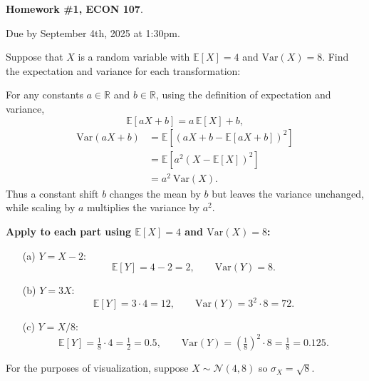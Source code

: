 \documentclass[11pt,answers]{exam}
\newcommand{\R}{\mathbb{R}}
\newcommand{\E}{\mathbb{E}}
\newcommand{\Var}{\mathrm{Var}}
\begin{document}
\begin{center}
  \large \textbf{Homework \#1, ECON 107}.
\end{center}

Due by September 4th, 2025 at 1:30pm.

\begin{questions}

\question Suppose that $X$ is a random variable with $\E[X]=4$ and $\Var(X)=8$.
Find the expectation and variance for each transformation:

\begin{solution}
For any constants $a\in\R$ and $b\in\R$, using the definition of expectation and variance,
\[
\E[aX+b]=a\,\E[X]+b, 
\]
\begin{align*}
\Var(aX+b) 
&= \E\!\left[(aX+b-\E[aX+b])^2\right] \\
&= \E\!\left[a^2(X-\E[X])^2\right] \\
&= a^2 \: \Var(X).
\end{align*}
Thus a constant shift $b$ changes the mean by $b$ but leaves the variance unchanged, while scaling by $a$ multiplies the variance by $a^2$.

\medskip
\textbf{Apply to each part using $\E[X]=4$ and $\Var(X)=8$:}
\begin{enumerate}
  \item[(a)] $Y=X-2$:
  \[
    \E[Y]=4-2=2,
    \qquad
    \Var(Y)=8.
  \]
  \item[(b)] $Y=3X$:
  \[
    \E[Y]=3\cdot 4=12,
    \qquad
    \Var(Y)=3^2\cdot 8=72.
  \]
  \item[(c)] $Y=X/8$:
  \[
    \E[Y]=\tfrac{1}{8}\cdot 4=\tfrac{1}{2}=0.5,
    \qquad
    \Var(Y)=\left(\tfrac{1}{8}\right)^2\cdot 8=\tfrac{1}{8}=0.125.
  \]
\end{enumerate}

\medskip
For the purposes of visualization, suppose $X\sim\mathcal{N}(4,8)$ so $\sigma_X=\sqrt{8}$. 


\end{solution}
\end{questions}
\end{document}
